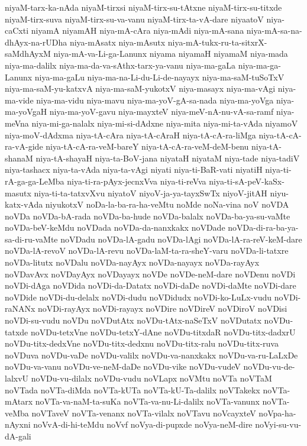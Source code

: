 {niyaM-tarx-ka-nAda
niyaM-tirxsi
niyaM-tirx-su-tAtxne
niyaM-tirx-su-titxde
niyaM-tirx-suva
niyaM-tirx-su-va-vanu
niyaM-tirx-ta-vA-dare
niyaatoV
niya-caCxti
niyamA
niyamAH
niya-mA-cAra
niya-mAdi
niya-mA-sana
niya-mA-sa-na-dhAyx-na-rUDha
niya-mAsatx
niya-mAsutx
niya-mA-tukx-ru-ta-sitxrX-saMdhAyxM
niya-mA-va-Li-ga-Lanunx
niyama
niyamaH
niyamaM
niya-mada
niya-ma-dalilx
niya-ma-da-va-sAthx-tarx-ya-vanu
niya-ma-gaLa
niya-ma-ga-Lanunx
niya-ma-gaLu
niya-ma-na-Li-du-Li-de-nayayx
niya-ma-saM-tuSoTxV
niya-ma-saM-yu-katxvA
niya-ma-saM-yukotxV
niya-masayx
niya-ma-vAgi
niya-ma-vide
niya-ma-vidu
niya-mavu
niya-ma-yoV-gA-sa-nada
niya-ma-yoVga
niya-ma-yoVgaH
niya-ma-yoV-gavu
niya-mayxteV
niya-meV-nA-nu-vA-sa-ramf
niya-meVna
niya-mi-ga-nalalx
niya-mi-si-dAdxne
niya-mita
niya-mi-ta-vAda
niyamoV
niya-moV-dAdxma
niya-tA-cAra
niya-tA-cAraH
niya-tA-cA-ra-liMga
niya-tA-cA-ra-vA-gide
niya-tA-cA-ra-veM-bareY
niya-tA-cA-ra-veM-deM-benu
niya-tA-shanaM
niya-tA-shayaH
niya-ta-BoV-jana
niyataH
niyataM
niya-tade
niya-tadiV
niya-tashacx
niya-ta-vAda
niya-ta-vAgi
niyati
niya-ti-BaR-vati
niyatiH
niya-ti-rA-ga-ga-LeMba
niya-ti-ra-pAyx-jecnxVva
niya-ti-reVva
niya-ti-sA-peV-kaSx-masutx
niya-ti-ta-tatxvXvu
niyatoV
niyoV-ja-ya-tayxSwTx
niyoV-jitAH
niyu-katx-vAda
niyukotxV
noDa-la-ba-ra-ha-veMtu
noMde
noNa-vina
noV
noVDA
noVDa
noVDa-bA-rada
noVDa-ba-hude
noVDa-balalx
noVDa-ba-ya-su-vaMte
noVDa-beV-keMdu
noVDada
noVDa-da-nanxkakx
noVDade
noVDa-di-ra-ba-ya-sa-di-ru-vaMte
noVDadu
noVDa-lA-gadu
noVDa-lAgi
noVDa-lA-ra-reV-keM-dare
noVDa-lA-revoV
noVDa-lA-revu
noVDa-laM-ta-ra-sheY-varu
noVDa-li-tatxre
noVDa-litutx
noVDalu
noVDa-nayAyx
noVDa-nayayx
noVDa-rayAyx
noVDavAvx
noVDayAyx
noVDayayx
noVDe
noVDe-neM-dare
noVDenu
noVDi
noVDi-dAga
noVDida
noVDi-da-Datatx
noVDi-daDe
noVDi-daMte
noVDi-dare
noVDide
noVDi-du-delalx
noVDi-dudu
noVDidudx
noVDi-ko-LuLx-vudu
noVDi-raNANx
noVDi-rayAyx
noVDi-rayayx
noVDire
noVDireV
noVDiroV
noVDisi
noVDi-su-vudu
noVDu
noVDutAtx
noVDu-tAtx-naSeTxV
noVDutatx
noVDu-tatxde
noVDu-tetxVne
noVDu-tetxY-dAne
noVDu-titxdaR
noVDu-titx-dadxrU
noVDu-titx-dedxVne
noVDu-titx-dedxnu
noVDu-titx-ralu
noVDu-titx-ruva
noVDuva
noVDu-vaDe
noVDu-valilx
noVDu-va-nanxkakx
noVDu-va-ru-LaLxDe
noVDu-va-vanu
noVDu-ve-neM-daDe
noVDu-vike
noVDu-vudeV
noVDu-vu-de-lalxvU
noVDu-vu-dilalx
noVDu-vudu
noVLapx
noVMtu
noVTa
noVTaM
noVTada
noVTa-diMda
noVTa-kUTa
noVTa-kU-Ta-dalilx
noVTakekx
noVTa-mAtarx
noVTa-va-naM-ta-suKa
noVTa-va-nu-Li-dalilx
noVTa-vanunx
noVTa-veMba
noVTaveV
noVTa-venanx
noVTa-vilalx
noVTavu
noVcayxteV
noVpa-ha-nAyxni
noVvA-di-hi-teMdu
noVvf
noVya-di-pupxde
noVya-neM-dire
noVyi-su-vu-dA-gali
}
